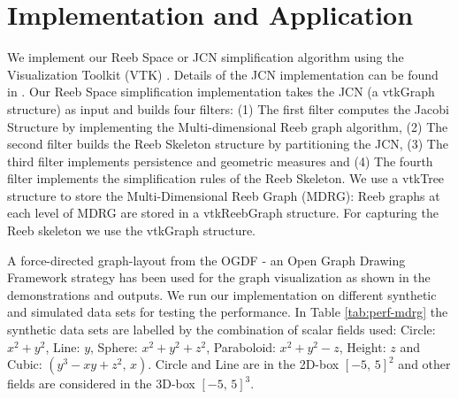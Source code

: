 \documentclass[twocolumn]{article}
\newcommand{\tabref}[1]{Table \ref{tab:#1}}
\begin{document}
%
 

\section{Implementation and Application}
\label{sec:Implementation}

We implement our Reeb Space or JCN simplification algorithm using the Visualization Toolkit (VTK)
\cite{vtk}. Details of the JCN implementation can be found in \cite{2013-Carr-TVCG,
  2012-Duke-VisWeek}. Our Reeb Space simplification implementation takes the JCN (a vtkGraph
structure) as input and builds four filters: (1) The first filter computes the
Jacobi Structure by implementing the Multi-dimensional Reeb graph
algorithm, (2) The second filter builds the Reeb Skeleton structure by
partitioning the JCN, (3) The third filter implements persistence and geometric measures and (4) The fourth filter implements the
simplification rules of the Reeb Skeleton.
We use a vtkTree structure to store the Multi-Dimensional Reeb Graph (MDRG): 
Reeb graphs at each level of MDRG are stored in a vtkReebGraph structure. For capturing 
the Reeb skeleton we use the vtkGraph structure. 

\begin{table}[h!]
 \begin{centering}
 \caption{Data Statistics}
\label{tab:perf-mdrg}
\end{centering}
\end{table}
A force-directed graph-layout from the OGDF - an Open Graph Drawing
Framework \cite{ogdf} strategy has been used for the graph
visualization as shown in the demonstrations and outputs.
We run our implementation on different synthetic and simulated data sets for
testing the performance.  In \tabref{perf-mdrg} the synthetic data sets are 
labelled by the combination of scalar fields used: Circle: $x^2+y^2$, Line: $y$, 
Sphere: $x^2+y^2+z^2$, Paraboloid: $x^2+y^2-z$, Height: $z$ and Cubic: $(y^3-xy+z^2, \,
  x)$. Circle and Line are in the 2D-box $[-5,\, 5]^2$ and other fields are
  considered in the 3D-box $[-5,\, 5]^3$. 
\end{document}
